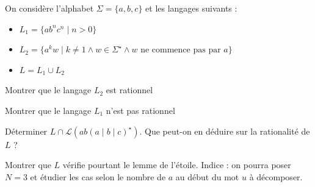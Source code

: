 
\begingroup

\begin{exercice}\label{exo:lexing/expressiveness/challenge}

  On considère l'alphabet $\Sigma = \{a,b,c\}$ et les langages suivants :
  \begin{itemize}
  \item $L_1 = \{ ab^n c^n \mid n > 0 \}$
  \item $L_2 = \{ a^k w \mid k\neq 1 \land w\in\Sigma^\star \land w \text{ ne commence pas par } a \}$
  \item $L = L_1 \cup L_2$
  \end{itemize}
  
  \begin{questions}
  \item Montrer que le langage $L_2$ est rationnel
  \item Montrer que le langage $L_1$ n'est pas rationnel
  \item Déterminer $L \cap \mathcal{L}\left(ab (a\mid b\mid c)^\star \right)$. Que peut-on en déduire sur la rationalité de $L$ ?
  \item Montrer que $L$ vérifie pourtant le lemme de l'étoile. Indice : on pourra poser $N = 3$ et étudier les cas selon le nombre de $a$ au début du mot $u$ à décomposer.
  \end{questions}
  
\end{exercice}

